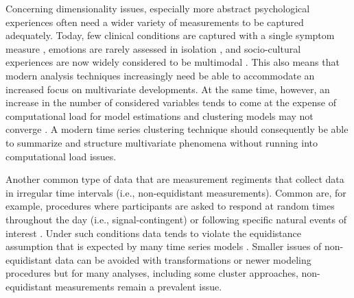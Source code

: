 \documentclass[man, 12pt, a4paper, mask]{apa7}
\theoremstyle{break}
\theoremstyle{plain}
\begin{document}
Concerning dimensionality issues, especially more abstract psychological experiences often need a wider variety of measurements to be captured adequately. Today, few clinical conditions are captured with a single symptom measure \citep[e.g.,][]{cramer2016}, emotions are rarely assessed in isolation \citep[e.g.,][]{reitsema2022}, and socio-cultural experiences are now widely considered to be multimodal \citep[e.g.,][]{Kreienkamp2022d}. This also means that modern analysis techniques increasingly need be able to accommodate an increased focus on multivariate developments. At the same time, however, an increase in the number of considered variables tends to come at the expense of computational load for model estimations and clustering models may not converge \citep[the aforementioned dimensionality curse;][]{altman2018}. A modern time series clustering technique should consequently be able to summarize and structure multivariate phenomena without running into computational load issues.

Another common type of data that are measurement regiments that collect data in irregular time intervals (i.e., non-equidistant measurements). Common are, for example, procedures where participants are asked to respond at random times throughout the day (i.e., signal-contingent) or following specific natural events of interest \citep[i.e., event-contingent; see][]{shiffman2008, myin-germeys2018}. Under such conditions data tends to violate the equidistance assumption that is expected by many time series models \citep[][]{hamaker2017}. Smaller issues of non-equidistant data can be avoided with transformations \citep[e.g., dynamic time warping,][]{berndt1994} or newer modeling procedures \citep[e.g., continuous-time models;][]{dehaan-rietdijk2017} but for many analyses, including some cluster approaches, non-equidistant measurements remain a prevalent issue. 
\end{document}
